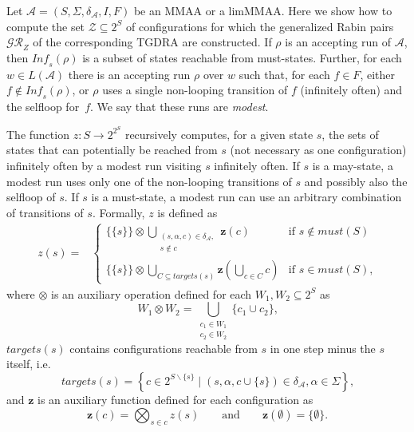 \documentclass{llncs}
\newcommand{\mA}{\mathcal{A}}
\newcommand{\mGR}{\mathcal{GR}}
\newcommand{\mT}{\mathcal{T}}
\newcommand{\mZ}{\mathcal{Z}}
\newcommand{\A}{_{\mA}}			\newcommand{\T}{_{\mT}}
\newcommand{\Inf}{\mathit{Inf\!}}
\newcommand{\must}{\mathit{must}}
\newcommand{\targets}{\mathit{targets}}
\begin{document}
Let $\mA = (S,\Sigma,\delta\A,I,F)$ be an MMAA or a limMMAA.  Here
we show how to compute the set $\mZ \subseteq 2^S$ of configurations
for which the generalized Rabin pairs $\mGR_Z$ of the
corresponding TGDRA are constructed.  If $\rho$ is an accepting run of $\mA$, then
$\Inf_s(\rho)$ is a subset of states reachable from must-states.  Further,
for each $w\in L(\mA)$ there is an accepting run $\rho$ over $w$ such that,
for each $f\in F$, either $f\notin\Inf_s(\rho)$, or $\rho$ uses a single
non-looping transition of $f$ (infinitely often) and the selfloop for~$f$.
We say that these runs are \emph{modest}.

The function $z:S\rightarrow 2^{2^S}$ recursively computes, for a given
state $s$, the sets of states that can potentially be reached from $s$ (not
necessary as one configuration) infinitely often by a modest run visiting
$s$ infinitely often. If $s$ is a may-state, a modest run uses only one of
the non-looping transitions of $s$ and possibly also the selfloop of $s$.
If $s$ is a must-state, a modest run can use an arbitrary combination of
transitions of $s$. Formally, $z$ is defined as
\begin{align*}
   z(s) = &\begin{cases}
   \{\{s\}\} \otimes \bigcup_{\substack{(s,\alpha,c) \in \delta\A, \\ s \notin 
   c}} \mathbf{z}(c) & \text{if } s \notin \must(S) \\[3ex]
   \{\{s\}\} \otimes \bigcup_{C \subseteq {\targets(s)}}  \mathbf{z}(\bigcup\limits_{c 
   \in C} c)      & \text{if } s \in \must(S)\text{,}
  \end{cases}
\end{align*}
where $\otimes$ is an auxiliary operation defined for each $W_1,W_2\subseteq
2^S$ as
\[
W_1 \otimes W_2 = \textstyle \bigcup_{\substack{c_1 \in W_1 \\
    c_2 \in W_2}} \{c_1 \cup c_2\}\text{,}
\]
$\targets(s)$ contains configurations reachable from $s$ in one step minus
the $s$ itself, i.e.
\[
\targets(s) = \left\{ c \in 2^{S\smallsetminus\{s\}} \mid (s, \alpha,c \cup
  \{s\}) \in \delta\A, \alpha \in \Sigma\right\}\text{,}
\]
and $\mathbf{z}$ is an auxiliary function defined for each configuration as
\[
\mathbf{z}(c) = \textstyle \bigotimes_{s \in c} z(s)
\qquad\textrm{and}\qquad
\mathbf{z}(\emptyset) = \{\emptyset\}.
\]
\end{document}
